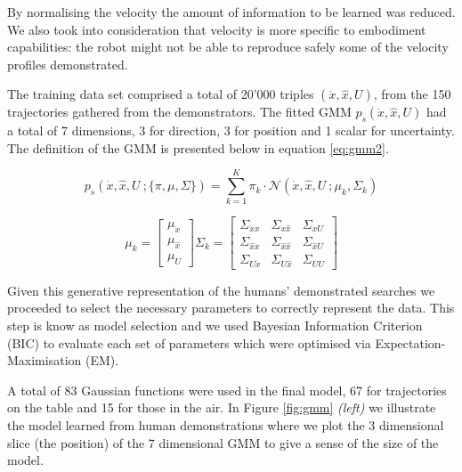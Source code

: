 By normalising the velocity the amount of information to be learned was reduced. We also took into consideration that velocity is more 
specific to embodiment capabilities: the robot might not be able to reproduce safely some of the velocity profiles demonstrated. 

The training data set comprised a total of 20'000 triples $(\dot{x},\hat{x},U)$, from the 150 trajectories gathered from the demonstrators. 
The fitted GMM $p_s(\dot{x},\hat{x},U)$ had a total of 7 dimensions, 3 for direction, 3 for position and 1 scalar for uncertainty. 
The definition of the GMM is presented below in equation \ref{eq:gmm2}.

\begin{equation} \label{eq:gmm2}
 p_s(\dot{x},\hat{x},U\: ; \{\pi,\mu,\Sigma\}) = \sum\limits_{k=1}^{K} \pi_{k} \cdot \mathcal{N}(\dot{x},\hat{x},U\: ;\mu_{k},\Sigma_{k} )
\end{equation}

\begin{equation*}
    \mu_{k} =
    \begin{bmatrix}
      \mu_{\dot{x}} \\
      \mu_{\hat{x}} \\
      \mu_{U}
    \end{bmatrix}
    \Sigma_{k} =
    \begin{bmatrix}
      \Sigma_{\dot{x}\dot{x}} & \Sigma_{\dot{x}\hat{x}} & \Sigma_{\dot{x}U} \\
      \Sigma_{\hat{x}\dot{x}} & \Sigma_{\hat{x}\hat{x}} & \Sigma_{\hat{x}U} \\
      \Sigma_{U\dot{x}} & \Sigma_{U\hat{x}} & \Sigma_{UU}   
    \end{bmatrix}
\end{equation*}

Given this generative representation of the humans' demonstrated searches we proceeded to 
select the necessary parameters to correctly represent the data. This step
is know as model selection and we used Bayesian Information Criterion (BIC) to evaluate
each set of parameters which were optimised via Expectation-Maximisation (EM). 

A total of 83 Gaussian functions were used in the final model, 67 for trajectories on the table and 15 for those in the air. In Figure
\ref{fig:gmm} \textit{(left)} we illustrate the model learned from human demonstrations where we plot the 3 dimensional slice (the position) of the 7
dimensional GMM to give a sense of the size of the model.

